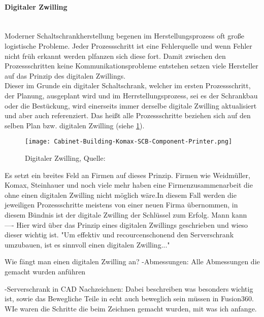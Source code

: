     \paragraph{Digitaler Zwilling}\mbox{}\\
    Moderner Schaltschrankherstellung begenen im Herstellungsprozess oft große logistische Probleme. Jeder Prozessschritt ist eine Fehlerquelle und wenn Fehler nicht früh erkannt werden plfanzen sich diese fort. Damit zwischen den Prozessschritten keine Kommunikationsprobleme entstehen setzen viele Hersteller auf das Prinzip des digitalen Zwillings.\\
    Dieser im Grunde ein digitaler Schaltschrank, welcher im ersten Prozessschritt, der Planung, ausgeplant wird und im Herrstellungsprozess, sei es der Schrankbau oder die Bestückung, wird einerseits immer derselbe digitale Zwilling aktualisiert und aber auch referenziert. Das heißt alle Prozessschritte beziehen sich auf den selben Plan bzw. digitalen Zwilling (siehe \ref{fig:digilaerZwilling}).\\

    \begin{figure}[H]
        \centering
        \texttt{[image: Cabinet-Building-Komax-SCB-Component-Printer.png]}
        \caption{Digitaler Zwilling, Quelle: \cite{digitaler_zwilling_bild}}
        \label{fig:digilaerZwilling}
    \end{figure}
    
    Es setzt ein breites Feld an Firmen auf dieses Prinzip. Firmen wie Weidmüller, Komax, Steinhauer und noch viele mehr haben eine Firmenzusammenarbeit die ohne einen digitalen Zwilling nicht möglich wäre\cite{smart_cabinet_building}.In diesem Fall werden die jeweiligen Prozessschritte meistens von einer neuen Firma übernommen, in diesem Bündnis ist der digitale Zwilling der Schlüssel zum Erfolg. Mann kann \\

    ----
    Hier wird über das Prinzip eines digitalen Zwillings geschrieben und wieso dieser wichtig ist. "Um effektiv und recourcenschonend den Serverschrank umzubauen, ist es sinnvoll einen digitalen Zwilling..." 
    
    Wie fängt man einen digitalen Zwilling an?
    -Abmessungen: Alle Abmessungen die gemacht wurden anführen

    -Serverschrank in CAD Nachzeichnen: Dabei beschreiben was besonders wichtig ist, sowie das Bewegliche Teile in echt auch beweglich sein müssen in Fusion360. WIe waren die Schritte die beim Zeichnen gemacht wurden, mit was ich anfange.

